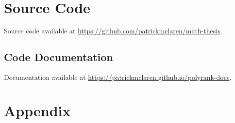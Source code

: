 \documentclass{amsart}
\theoremstyle{definition}
\theoremstyle{remark}
\numberwithin{equation}{section}
\begin{document}
% 
% 
% 
% 

\section{Source Code}

Source code available at \url{https://github.com/patrickmclaren/math-thesis}.

\subsection{Code Documentation}

Documentation available at \url{https://patrickmclaren.github.io/polyrank-docs}.

\newpage

\section{Appendix}



\newpage

\printbibliography
\end{document}
